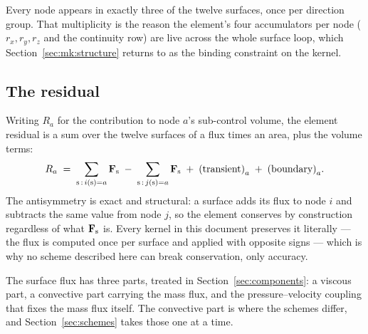 Every node appears in exactly three of the twelve surfaces, once per direction group. That
multiplicity is the reason the element's four accumulators per node ($r_x, r_y, r_z$ and the
continuity row) are live across the whole surface loop, which
Section~\ref{sec:mk:structure} returns to as the binding constraint on the kernel.

\subsection{The residual}

Writing $R_a$ for the contribution to node $a$'s sub-control volume, the element residual is a
sum over the twelve surfaces of a flux times an area, plus the volume terms:
\begin{equation}
R_a \;=\; \sum_{\mathrm{s} \,:\, i(\mathrm{s})=a} \mathbf{F}_{\mathrm{s}}
      \;-\; \sum_{\mathrm{s} \,:\, j(\mathrm{s})=a} \mathbf{F}_{\mathrm{s}}
      \;+\; \text{(transient)}_a \;+\; \text{(boundary)}_a .
\label{eq:residual}
\end{equation}
The antisymmetry is exact and structural: a surface adds its flux to node $i$ and subtracts the
same value from node $j$, so the element conserves by construction regardless of what
$\mathbf{F}_{\mathrm{s}}$ is. Every kernel in this document preserves it literally --- the flux is
computed once per surface and applied with opposite signs --- which is why no scheme described
here can break conservation, only accuracy.

The surface flux has three parts, treated in Section~\ref{sec:components}: a viscous part, a
convective part carrying the mass flux, and the pressure--velocity coupling that fixes the mass
flux itself. The convective part is where the schemes differ, and Section~\ref{sec:schemes}
takes those one at a time.
